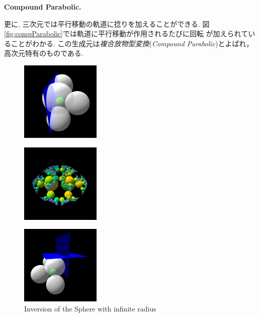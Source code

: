 \noindent\textbf{Compound Parabolic.}

更に, 三次元では平行移動の軌道に捻りを加えることができる.
図\ref{fig:compParabolic}では軌道に平行移動が作用されるたびに回転
が加えられていることがわかる.
この生成元は\emph{複合放物型変換}(\textit{Compound Parabolic})とよばれ，
高次元特有のものである.

\begin{figure}[h!tbp]
 \begin{minipage}[]{0.49\hsize}
  \begin{minipage}[]{0.24\hsize}
   \center
   \includegraphics[width=1.5in, height=1.5in, keepaspectratio]{../img/klein/3diis/infSphereGen.pdf}
   \label{fig:infSphereGen}
  \end{minipage}
  \hspace*{\fill}
  \begin{minipage}[]{0.24\hsize}
   \center
   \includegraphics[width=1.5in, height=1.5in, keepaspectratio]{../img/klein/3diis/infSphereOrbit.pdf}
   \label{fig:infSphereOrb}
  \end{minipage}
  \hspace*{\fill}
  \caption{Inversion of the Sphere with infinite radius}
  \label{fig:infSphere}
 \end{minipage}
 \begin{minipage}[]{0.49\hsize}
  \begin{minipage}[]{0.24\hsize}
   \center
   \includegraphics[width=1.5in, height=1.5in, keepaspectratio]{../img/klein/3diis/rotationGen.pdf}

\end{minipage}
\end{minipage}
\end{figure}
